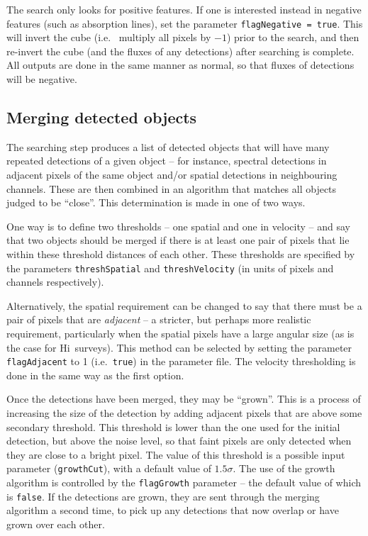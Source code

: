 \documentclass[12pt,a4paper]{article}
\newcommand{\ie}{i.e.\ }
\newcommand{\hi}{H{\sc i}}
\begin{document}
The search only looks for positive features. If one is interested
instead in negative features (such as absorption lines), set the
parameter \texttt{flagNegative = true}. This will invert the cube (\ie
multiply all pixels by $-1$) prior to the search, and then re-invert
the cube (and the fluxes of any detections) after searching is
complete. All outputs are done in the same manner as normal, so that
fluxes of detections will be negative.

\subsection{Merging detected objects}
\label{sec-merger}

The searching step produces a list of detected objects that will have many
repeated detections of a given object -- for instance, spectral
detections in adjacent pixels of the same object and/or spatial
detections in neighbouring channels. These are then combined in an
algorithm that matches all objects judged to be ``close''. This
determination is made in one of two ways.

One way is to define two thresholds -- one spatial and one in velocity
-- and say that two objects should be merged if there is at least one
pair of pixels that lie within these threshold distances of each
other. These thresholds are specified by the parameters
\texttt{threshSpatial} and \texttt{threshVelocity} (in units of pixels
and channels respectively).

Alternatively, the spatial requirement can be changed to say that
there must be a pair of pixels that are \emph{adjacent} -- a stricter,
but perhaps more realistic requirement, particularly when the spatial pixels
have a large angular size (as is the case for \hi\ surveys). This
method can be selected by setting the parameter
\texttt{flagAdjacent} to 1 (\ie \texttt{true}) in the parameter file. The
velocity thresholding is done in the same way as the first option.

Once the detections have been merged, they may be ``grown''. This is a
process of increasing the size of the detection by adding adjacent
pixels that are above some secondary threshold. This threshold is
lower than the one used for the initial detection, but above the noise
level, so that faint pixels are only detected when they are close to a
bright pixel. The value of this threshold is a possible input
parameter (\texttt{growthCut}), with a default value of $1.5\sigma$. The
use of the growth algorithm is controlled by the \texttt{flagGrowth}
parameter -- the default value of which is \texttt{false}. If the
detections are grown, they are sent through the merging algorithm a
second time, to pick up any detections that now overlap or have grown
over each other.
\end{document}
